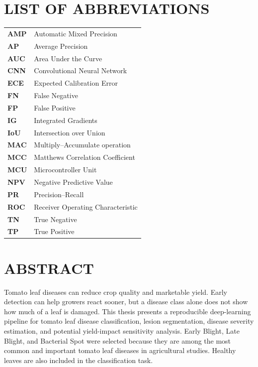 \documentclass[12pt,a4paper]{article}
\begin{document}
\clearpage
\section*{LIST OF ABBREVIATIONS}
\begin{longtable}{>{\bfseries}p{}p{}}
AMP & Automatic Mixed Precision\\
AP & Average Precision\\
AUC & Area Under the Curve\\
CNN & Convolutional Neural Network\\
ECE & Expected Calibration Error\\
FN & False Negative\\
FP & False Positive\\
IG & Integrated Gradients\\
IoU & Intersection over Union\\
MAC & Multiply--Accumulate operation\\
MCC & Matthews Correlation Coefficient\\
MCU & Microcontroller Unit\\
NPV & Negative Predictive Value\\
PR & Precision--Recall\\
ROC & Receiver Operating Characteristic\\
TN & True Negative\\
TP & True Positive\\
\end{longtable}

\clearpage
{}
\listoftables
\clearpage
{}
\listoffigures

\clearpage
\section*{ABSTRACT}
Tomato leaf diseases can reduce crop quality and marketable yield. Early detection can
help growers react sooner, but a disease class alone does not show how much of a leaf is
damaged. This thesis presents a reproducible deep-learning pipeline for tomato leaf
disease classification, lesion segmentation, disease severity estimation, and potential
yield-impact sensitivity analysis. Early Blight, Late Blight, and Bacterial Spot were
selected because they are among the most common and important tomato leaf diseases in
agricultural studies. Healthy leaves are also included in the classification task.
\end{document}
